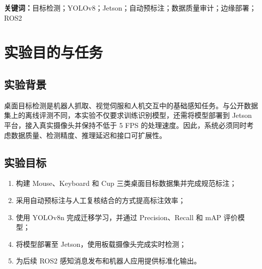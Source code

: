 \documentclass[UTF8,fontset=none,a4paper,11pt]{ctexart}
\begin{document}
\vspace{0.8em}\noindent\textbf{关键词：}目标检测；YOLOv8；Jetson；自动预标注；数据质量审计；边缘部署；ROS2
\clearpage\tableofcontents\clearpage
{}\setcounter{page}{1}

\section{实验目的与任务}
\subsection{实验背景}
桌面目标检测是机器人抓取、视觉伺服和人机交互中的基础感知任务。与公开数据集上的离线评测不同，本实验不仅要求训练识别模型，还需将模型部署到 Jetson 平台，接入真实摄像头并保持不低于 5 FPS 的处理速度。因此，系统必须同时考虑数据质量、检测精度、推理延迟和接口可扩展性。
\subsection{实验目标}
\begin{enumerate}
 \item 构建 Mouse、Keyboard 和 Cup 三类桌面目标数据集并完成规范标注；
 \item 采用自动预标注与人工复核结合的方式提高标注效率；
 \item 使用 YOLOv8n 完成迁移学习，并通过 Precision、Recall 和 mAP 评价模型；
 \item 将模型部署至 Jetson，使用板载摄像头完成实时检测；
 \item 为后续 ROS2 感知消息发布和机器人应用提供标准化输出。
\end{enumerate}
\end{document}
